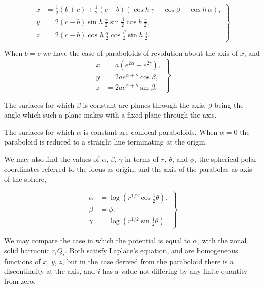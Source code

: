 \documentclass[11pt,a4paper]{article}
\begin{document}
\begin{equation}\tag{52}
\left.
\begin{aligned}
x&=\frac12(b+c)+\frac12(c-b)(\cos h\,\gamma-\cos\beta-\cos h\,\alpha),\\
y&=2(c-b)\sin h\,\frac{\alpha}{2}\sin\frac{\beta}{2}\cos h\,\frac{\gamma}{2},\\
z&=2(c-b)\cos h\,\frac{\alpha}{2}\cos\frac{\beta}{2}\sin h\,\frac{\gamma}{2}.
\end{aligned}
\right\}
\end{equation}

When $b=c$ we have the case of paraboloids of revolution about the axis of $x$, and
\begin{equation}\tag{53}
\left.
\begin{aligned}
x&=a(e^{2\alpha}-e^{2\gamma}),\\
y&=2ae^{\alpha+\gamma}\cos\beta,\\
z&=2ae^{\alpha+\gamma}\sin\beta.
\end{aligned}
\right\}
\end{equation}

The surfaces for which $\beta$ is constant are planes through the axis, $\beta$ being the angle which such a plane makes with a fixed plane through the axis.

The surfaces for which $\alpha$ is constant are confocal paraboloids. When $\alpha=0$ the paraboloid is reduced to a straight line terminating at the origin.

We may also find the values of $\alpha$, $\beta$, $\gamma$ in terms of $r$, $\theta$, and $\phi$, the spherical polar coordinates referred to the focus as origin, and the axis of the parabolas as axis of the sphere,

\begin{equation}\tag{54}
\left.
\begin{aligned}
\alpha&=\log(r^{1/2}\cos\tfrac12\theta),\\
\beta&=\phi,\\
\gamma&=\log(r^{1/2}\sin\tfrac12\theta).
\end{aligned}
\right\}
\end{equation}

We may compare the case in which the potential is equal to $\alpha$, with the zonal solid harmonic $r_iQ_i$. Both satisfy Laplace's equation, and are homogeneous functions of $x$, $y$, $z$, but in the case derived from the paraboloid there is a discontinuity at the axis, and $i$ has a value not differing by any finite quantity from zero.
\end{document}
